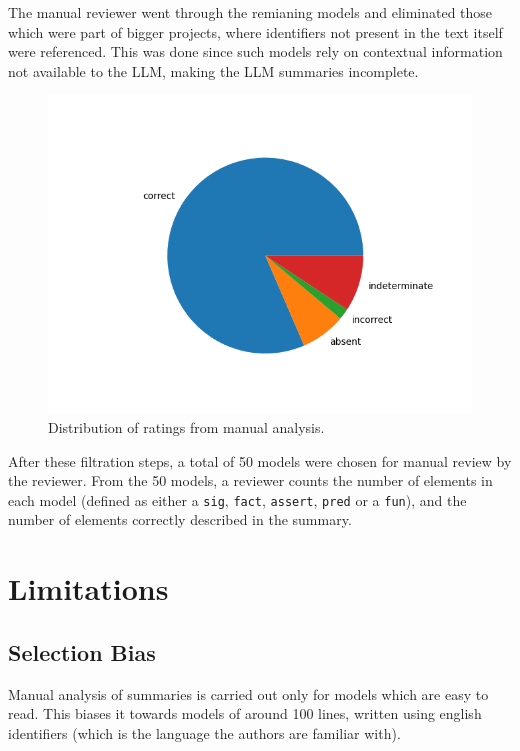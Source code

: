 \documentclass[conference]{IEEEtran}
\begin{document}
The manual reviewer went through the remianing models and eliminated those which were part of bigger projects, where identifiers not present in the text itself were referenced. This was done since such models rely on contextual information not available to the LLM, making the LLM summaries incomplete.

\begin{figure}[htbp]
\centerline{\includegraphics[width=\linewidth]{"./Distribution of ratings from manual analysis.png"}}
\caption{Distribution of ratings from manual analysis.}
\label{fig}
\end{figure}

After these filtration steps, a total of 50 models were chosen for manual review by the reviewer. From the 50 models, a reviewer counts the number of elements in each model (defined as either a \verb|sig|, \verb|fact|, \verb|assert|, \verb|pred| or a \verb|fun|), and the number of elements correctly described in the summary.

\section{Limitations}



\subsection{Selection Bias}

Manual analysis of summaries is carried out only for models which are easy to read. This biases it towards models of around 100 lines, written using english identifiers (which is the language the authors are familiar with).
\end{document}
